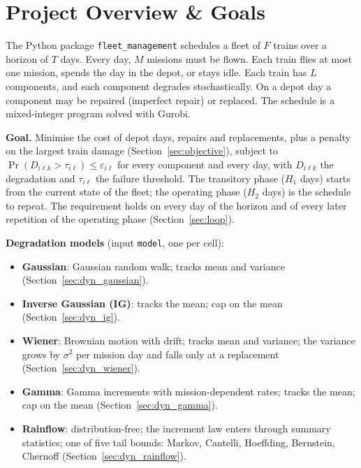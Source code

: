 \section{Project Overview \& Goals}
\label{sec:overview}

The Python package \texttt{fleet\_management} schedules a fleet of $F$ trains over a
horizon of $T$ days. Every day, $M$ missions must be flown. Each train flies at most
one mission, spends the day in the depot, or stays idle. Each train has $L$
components, and each component degrades stochastically. On a depot day a component
may be repaired (imperfect repair) or replaced. The schedule is a mixed-integer
program solved with Gurobi.

\textbf{Goal.} Minimise the cost of depot days, repairs and replacements, plus a
penalty on the largest train damage (Section~\ref{sec:objective}), subject to
$\Pr(D_{i\ell k} > \tau_{i\ell}) \leq \varepsilon_{i\ell}$ for every component and
every day, with $D_{i\ell k}$ the degradation and $\tau_{i\ell}$ the failure
threshold. The transitory phase ($H_1$ days) starts from the current state of the
fleet; the operating phase ($H_2$ days) is the schedule to repeat. The requirement
holds on every day of the horizon and of every later repetition of the operating
phase (Section~\ref{sec:loop}).

\textbf{Degradation models} (input \texttt{model}, one per cell):
\begin{itemize}[nosep,leftmargin=1.5em]
  \item \textbf{Gaussian}: Gaussian random walk; tracks mean and variance
        (Section~\ref{sec:dyn_gaussian}).
  \item \textbf{Inverse Gaussian (IG)}: tracks the mean; cap on the mean
        (Section~\ref{sec:dyn_ig}).
  \item \textbf{Wiener}: Brownian motion with drift; tracks mean and variance; the
        variance grows by $\sigma^2$ per mission day and falls only at a replacement
        (Section~\ref{sec:dyn_wiener}).
  \item \textbf{Gamma}: Gamma increments with mission-dependent rates; tracks the mean;
        cap on the mean (Section~\ref{sec:dyn_gamma}).
  \item \textbf{Rainflow}: distribution-free; the increment law enters through summary
        statistics; one of five tail bounds: Markov, Cantelli, Hoeffding, Bernstein,
        Chernoff (Section~\ref{sec:dyn_rainflow}).
\end{itemize}

